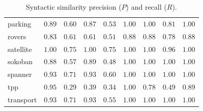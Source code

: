\begin{table}[t!]
{\begin{tabular}{|l|cccc|cccc|}
parking & $\mathbf{0.89}$ & $0.60$ & $0.87$ & $0.53$ & $\mathbf{1.00}$ & $\mathbf{1.00}$ & $0.81$ & $\mathbf{1.00}$ \\
rovers & $\mathbf{0.83}$ & $0.61$ & $0.61$ & $0.51$ & $\mathbf{0.88}$ & $\mathbf{0.88}$ & $0.78$ & $\mathbf{0.88}$ \\
satellite & $\mathbf{1.00}$ & $0.75$ & $\mathbf{1.00}$ & $0.75$ & $\mathbf{1.00}$ & $\mathbf{1.00}$ & $0.96$ & $\mathbf{1.00}$ \\
sokoban & $0.88$ & $0.57$ & $\mathbf{0.89}$ & $0.48$ & $\mathbf{1.00}$ & $\mathbf{1.00}$ & $\mathbf{1.00}$ & $\mathbf{1.00}$ \\
spanner & $\mathbf{0.93}$ & $0.71$ & $\mathbf{0.93}$ & $0.60$ & $\mathbf{1.00}$ & $\mathbf{1.00}$ & $\mathbf{1.00}$ & $\mathbf{1.00}$ \\
tpp & $\mathbf{0.95}$ & $0.29$ & $0.39$ & $0.34$ & $\mathbf{1.00}$ & $0.78$ & $0.49$ & $0.89$ \\
transport & $\mathbf{0.93}$ & $0.71$ & $\mathbf{0.93}$ & $0.55$ & $\mathbf{1.00}$ & $\mathbf{1.00}$ & $\mathbf{1.00}$ & $\mathbf{1.00}$ \\
\hline
\end{tabular}
}
\caption{\small{Syntactic similarity precision ($P$) and recall ($R$). 
}}
\label{tab:syntactic}
\end{table}
